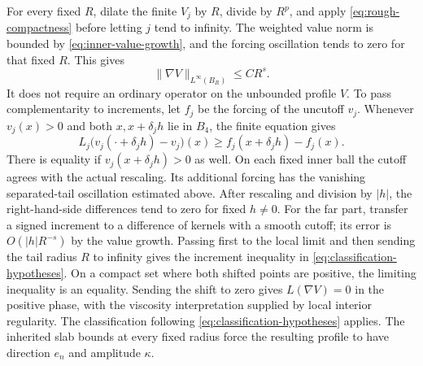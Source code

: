 \documentclass[11pt]{article}
\numberwithin{equation}{section}
\begin{document}
For every fixed $R$, dilate the finite $V_j$ by $R$, divide by $R^p$, and
apply \eqref{eq:rough-compactness} before letting $j$ tend to infinity.
The weighted value norm is bounded by \eqref{eq:inner-value-growth}, and
the forcing oscillation tends to zero for that fixed $R$. This gives
\begin{equation}\label{eq:inner-gradient-growth}
                       \|\nabla V\|_{L^\infty(B_R)}\leq CR^s.
\end{equation}
It does not require an ordinary operator on the unbounded profile $V$.
To pass complementarity to increments, let $f_j$ be the forcing of the
uncutoff $v_j$. Whenever $v_j(x)>0$ and both $x,x+\delta_jh$ lie in $B_4$,
the finite equation gives
\[
 L_j\bigl(v_j(\cdot+\delta_jh)-v_j\bigr)(x)
                         \geq f_j(x+\delta_jh)-f_j(x).
\]
There is equality if $v_j(x+\delta_jh)>0$ as well. On each fixed inner
ball the cutoff agrees with the actual rescaling. Its additional forcing
has the vanishing separated-tail oscillation estimated above. After
rescaling and division by $|h|$, the right-hand-side differences tend to
zero for fixed $h\ne0$. For the far part, transfer a signed
increment to a difference of kernels with a smooth cutoff; its error is
$O(|h|R^{-s})$ by the value growth. Passing first to the local limit and
then sending the tail radius $R$ to infinity gives the increment inequality
in \eqref{eq:classification-hypotheses}. On a compact set where both shifted
points are positive, the limiting inequality is an equality. Sending the
shift to zero gives $L(\nabla V)=0$ in the positive phase, with the
viscosity interpretation supplied by local interior regularity.
The classification following \eqref{eq:classification-hypotheses} applies.
The inherited slab bounds at every fixed radius force the resulting profile
to have direction $e_n$ and amplitude $\kappa$.
\end{document}
